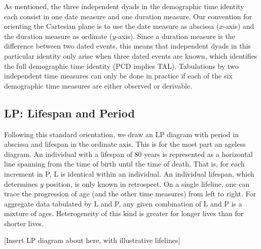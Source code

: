 \documentclass{bmcart}
\begin{document}
As mentioned, the three independent dyads in the demographic time identity each consist in one date measure and one duration measure. Our convention for orienting the Cartesian plane is to use the date measure as abscissa ($x$-axis) and the duration measure as ordinate ($y$-axis). Since a duration measure is the difference between two dated events, this means that independent dyads in this particular identity only arise when three dated events are known, which identifies the full demographic time identity (PCD implies TAL). Tabulations by two independent time measures can only be done in practice if each of the six demographic time measures are either observed or derivable. 

\subsection*{LP: Lifespan and Period}
Following this standard orientation, we draw an LP diagram with period in abscissa and lifespan in the ordinate axis. This is for the most part an ageless diagram. An individual with a lifespan of 80 years is represented as a horizontal line spanning from the time of birth until the time of death. That is, for each increment in P, L is identical within an individual. An individual lifespan, which determines $y$ position, is only known in retrospect. On a single lifeline, one can trace the progression of age (and the other time measures) from left to right. For aggregate data tabulated by L and P, any given combination of L and P is a mixture of ages. Heterogeneity of this kind is greater for longer lives than for shorter lives.

[Insert LP diagram about here, with illustrative lifelines]


\end{document}
